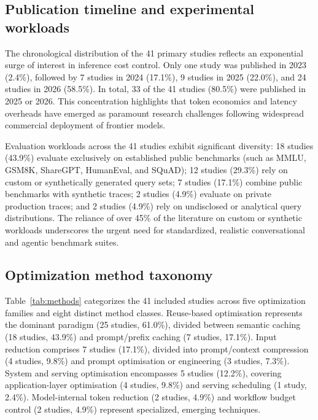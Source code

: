 \IfFileExists{jair.cls}{\documentclass{jair}}{\documentclass[manuscript,nonacm,screen]{acmart}}
\begin{document}
\subsection{Publication timeline and experimental workloads}

The chronological distribution of the 41 primary studies reflects an exponential surge of interest in inference cost control. Only one study was published in 2023 (2.4\%), followed by 7 studies in 2024 (17.1\%), 9 studies in 2025 (22.0\%), and 24 studies in 2026 (58.5\%). In total, 33 of the 41 studies (80.5\%) were published in 2025 or 2026. This concentration highlights that token economics and latency overheads have emerged as paramount research challenges following widespread commercial deployment of frontier models.

Evaluation workloads across the 41 studies exhibit significant diversity: 18 studies (43.9\%) evaluate exclusively on established public benchmarks (such as MMLU, GSM8K, ShareGPT, HumanEval, and SQuAD); 12 studies (29.3\%) rely on custom or synthetically generated query sets; 7 studies (17.1\%) combine public benchmarks with synthetic traces; 2 studies (4.9\%) evaluate on private production traces; and 2 studies (4.9\%) rely on undisclosed or analytical query distributions. The reliance of over 45\% of the literature on custom or synthetic workloads underscores the urgent need for standardized, realistic conversational and agentic benchmark suites.

\subsection{Optimization method taxonomy}

Table~\ref{tab:methods} categorizes the 41 included studies across five optimization families and eight distinct method classes. Reuse-based optimisation represents the dominant paradigm (25 studies, 61.0\%), divided between semantic caching (18 studies, 43.9\%) and prompt/prefix caching (7 studies, 17.1\%). Input reduction comprises 7 studies (17.1\%), divided into prompt/context compression (4 studies, 9.8\%) and prompt optimisation or engineering (3 studies, 7.3\%). System and serving optimisation encompasses 5 studies (12.2\%), covering application-layer optimisation (4 studies, 9.8\%) and serving scheduling (1 study, 2.4\%). Model-internal token reduction (2 studies, 4.9\%) and workflow budget control (2 studies, 4.9\%) represent specialized, emerging techniques.
\end{document}
